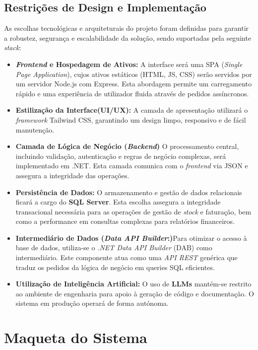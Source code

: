\documentclass[a4paper,12pt]{scrreprt}
\begin{document}
\subsection{Restrições de Design e Implementação}
As escolhas tecnológicas e arquiteturais do projeto foram definidas para garantir a robustez, segurança e escalabilidade da solução, sendo suportadas pela seguinte \textit{stack}:

\begin{itemize}
    \item \textbf{\textit{Frontend} e Hospedagem de Ativos:} A interface será uma SPA (\textit{Single Page Application}), cujos ativos estáticos (HTML, JS, CSS) serão servidos por um servidor Node.js com Express. Esta abordagem permite um carregamento rápido e uma experiência de utilizador fluida através de pedidos assíncronos.
    \item \textbf{Estilização da Interface(UI/UX):} A camada de apresentação utilizará o \textit{framework} Tailwind CSS, garantindo um design limpo, responsivo e de fácil manutenção.
    \item \textbf{Camada de Lógica de Negócio (\textit{Backend})} O processamento central, incluindo validação, autenticação e regras de negócio complexas, será implementado em .NET. Esta camada comunica com o \textit{frontend} via JSON e assegura a integridade das operações.
    \item \textbf{Persistência de Dados:} O armazenamento e gestão de dados relacionais ficará a cargo do \textbf{SQL Server}. Esta escolha assegura a integridade transacional necessária para as operações de gestão de \textit{stock} e faturação, bem como a performance em consultas complexas para relatórios financeiros.
    \item \textbf{Intermediário de Dados (\textit{Data API Builder}:)}Para otimizar o acesso à base de dados, utiliza-se o \textit{.NET Data API Builder} (DAB) como intermediário. Este componente atua como uma \textit{API REST} genérica que traduz os pedidos da lógica de negócio em queries SQL eficientes.
    \item \textbf{Utilização de Inteligência Artificial:} O uso de \textbf{LLMs} mantém-se restrito ao ambiente de engenharia para apoio à geração de código e documentação. O sistema em produção operará de forma autónoma.
\end{itemize}

\section{Maqueta do Sistema}
\end{document}
